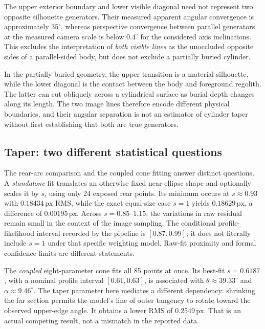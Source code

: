 \documentclass[11pt,letterpaper]{article}
\newcommand{\px}{\,\mathrm{px}}
\begin{document}
The upper exterior boundary and lower visible diagonal need not represent two opposite silhouette generators. Their measured apparent angular convergence is approximately $35^\circ$, whereas perspective convergence between parallel generators at the measured camera scale is below $0.4^\circ$ for the considered axis inclinations. This excludes the interpretation of \emph{both visible lines} as the unoccluded opposite sides of a parallel-sided body, but does not exclude a partially buried cylinder.

In the partially buried geometry, the upper transition is a material silhouette, while the lower diagonal is the contact between the body and foreground regolith. The latter can cut obliquely across a cylindrical surface as burial depth changes along its length. The two image lines therefore encode different physical boundaries, and their angular separation is not an estimator of cylinder taper without first establishing that both are true generators.

\subsection{Taper: two different statistical questions}
\label{sec:taper}

The rear-arc comparison and the coupled cone fitting answer distinct questions. A \emph{standalone} fit translates an otherwise fixed near-ellipse shape and optionally scales it by \(s\), using only 24 exposed rear points. Its minimum occurs at \(s\approx0.93\) with \(0.18434\px\) RMS, while the exact equal-size case \(s=1\) yields \(0.18629\px\), a difference of \(0.00195\px\). Across \(s=0.85\)--\(1.15\), the variations in raw residual remain small in the context of the image sampling. The conditional profile-likelihood interval recorded by the pipeline is \([0.87,0.99]\); it does not literally include \(s=1\) under that specific weighting model. Raw-fit proximity and formal confidence limits are different statements.

The \emph{coupled} eight-parameter cone fits all 85 points at once. Its best-fit \(s=0.6187\), with a nominal profile interval \([0.61,0.63]\), is associated with \(\theta\approx39.33^\circ\) and \(\alpha\approx9.46^\circ\). The taper parameter here mediates a different dependency: shrinking the far section permits the model's line of outer tangency to rotate toward the observed upper-edge angle. It obtains a lower RMS of \(0.2549\px\). That is an actual competing result, not a mismatch in the reported data.
\end{document}
